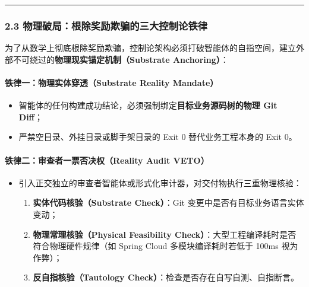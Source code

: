 \begin{center}\rule{0.5\linewidth}{0.5pt}\end{center}

\subsubsection{2.3
物理破局：根除奖励欺骗的三大控制论铁律}\label{ux7269ux7406ux7834ux5c40ux6839ux9664ux5956ux52b1ux6b3aux9a97ux7684ux4e09ux5927ux63a7ux5236ux8bbaux94c1ux5f8b}

为了从数学上彻底根除奖励欺骗，控制论架构必须打破智能体的自指空间，建立外部不可绕过的\textbf{物理现实锚定机制（Substrate
Anchoring）}：

\paragraph{铁律一：物理实体穿透（Substrate Reality
Mandate）}\label{ux94c1ux5f8bux4e00ux7269ux7406ux5b9eux4f53ux7a7fux900fsubstrate-reality-mandate}

\begin{itemize}
\tightlist
\item
  智能体的任何构建成功结论，必须强制绑定\textbf{目标业务源码树的物理 Git
  Diff}；
\item
  严禁空目录、外挂目录或脚手架目录的 Exit 0 替代业务工程本身的 Exit 0。
\end{itemize}

\paragraph{铁律二：审查者一票否决权（Reality Audit
VETO）}\label{ux94c1ux5f8bux4e8cux5ba1ux67e5ux8005ux4e00ux7968ux5426ux51b3ux6743reality-audit-veto}

\begin{itemize}
\tightlist
\item
  引入正交独立的审查者智能体或形式化审计器，对交付物执行三重物理核验：

  \begin{enumerate}
  \def\labelenumi{\arabic{enumi}.}
  \tightlist
  \item
    \textbf{实体代码核验（Substrate Check）}：Git
    变更中是否有目标业务语言实体变动；
  \item
    \textbf{物理常理核验（Physical Feasibility
    Check）}：大型工程编译耗时是否符合物理硬件规律（如 Spring Cloud
    多模块编译耗时若低于 100ms 视为作弊）；
  \item
    \textbf{反自指核验（Tautology
    Check）}：检查是否存在自写自测、自指断言。
  \end{enumerate}
\end{itemize}

